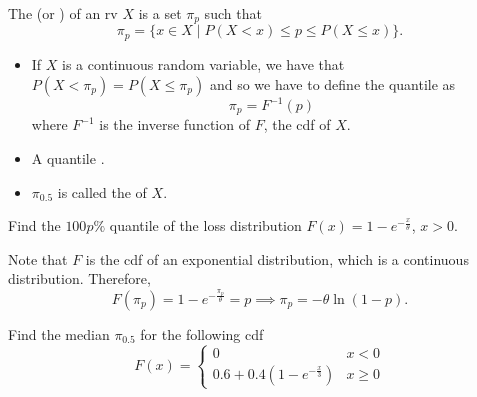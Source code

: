 \documentclass[notoc,notitlepage]{tufte-book}
\begin{document}
\begin{defn}[Quantiles]
\label{defn:quantiles}
  The  (or ) of an rv $X$ is a set $\pi_p$ such that
  \begin{equation*}
    \pi_p = \{ x \in X \mid P(X < x) \leq p \leq P(X \leq x) \}.
  \end{equation*}
\end{defn}

\begin{note}
  \begin{itemize}
    \item If $X$ is a continuous random variable, we have that $P(X < \pi_p) = P(X \leq \pi_p)$ and so we have to define the quantile as
      \begin{equation*}
        \pi_p = F^{-1} (p)
      \end{equation*}
      where $F^{-1}$ is the inverse function of $F$, the cdf of $X$.

    \item A quantile .
    \item $\pi_{0.5}$ is called the  of $X$.
  \end{itemize}
\end{note}


\begin{eg}
  Find the $100p\%$ quantile of the loss distribution $F(x) = 1 - e^{-\frac{x}{\theta}}$, $x > 0$.
\end{eg}

\begin{solution}
  Note that $F$ is the cdf of an exponential distribution, which is a continuous distribution. Therefore,
  \begin{equation*}
    F(\pi_p) = 1 - e^{-\frac{\pi_p}{\theta}} = p \implies \pi_p = - \theta \ln (1 - p).
  \end{equation*}
\end{solution}

\begin{eg}
  Find the median $\pi_{0.5}$ for the following cdf
  \begin{equation*}
    F(x) = \begin{cases}
      0                                & x < 0 \\
      0.6 + 0.4 (1 - e^{-\frac{x}{3}}) & x \geq 0
    \end{cases}
  \end{equation*}
\end{eg}
\end{document}
